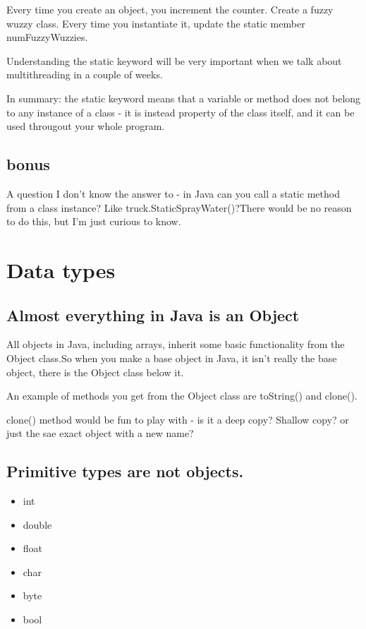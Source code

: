 \documentclass[12pt]{article}
\begin{document}
Every time you create an object, you increment the counter. Create a fuzzy wuzzy
class. Every time you instantiate it, update the static member numFuzzyWuzzies.

Understanding the static keyword will be very important when we talk about
multithreading in a couple of weeks.


In summary: the static keyword means that a variable or method does not belong
to any instance of a class - it is instead property of the class itself, and it
can be used througout your whole program.

\subsection{bonus}
A question I don't know the answer to - in Java can you call a static method
from a class instance? Like truck.StaticSprayWater()?There would be no reason to
do this, but I'm just curious to know.

\section{Data types}
\subsection{Almost everything in Java is an Object}
All objects in Java, including arrays, inherit some basic functionality from the
Object class.So when you make a base object in Java, it isn't really the base
object, there is the Object class below it. 

An example of methods you get from the Object class are toString() and clone().

clone() method would be fun to play with - is it a deep copy? Shallow copy? or
just the sae exact object with a new name?

\subsection{Primitive types are not objects.}
\begin{itemize}
\item int
\item double
\item float
\item char
\item byte
\item bool
\end{itemize}
\end{document}
